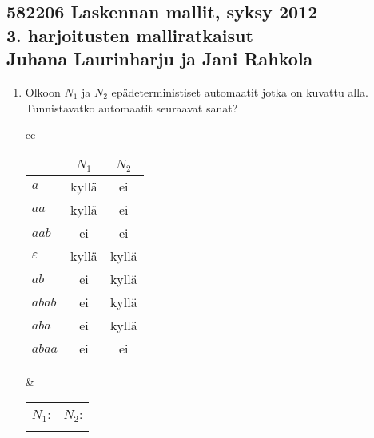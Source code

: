 \documentclass[a4paper,11pt,draft]{article}
\newenvironment{automata}[1][2.8]%
{\begin{tikzpicture}[->,>=stealth',shorten >=1pt,auto,node distance=#1cm,semithick]}%
{\end{tikzpicture}}
\begin{document}
\subsection*{582206 Laskennan mallit, syksy 2012 \\
  \textmd{3. harjoitusten malliratkaisut \\
    Juhana Laurinharju ja Jani Rahkola}}

\begin{enumerate}
\item
  Olkoon $N_1$ ja $N_2$ epädeterministiset automaatit jotka on kuvattu
  alla. Tunnistavatko automaatit seuraavat sanat?

  \begin{center}
    \begin{tabular}{cc}
      \begin{tabular}{l|c|c}
        & $N_1$ & $N_2$ \\
        \hline
        $a$ & kyllä & ei \\
        $aa$ & kyllä & ei \\
        $aab$ & ei & ei \\
        $\varepsilon$ & kyllä & kyllä \\
        $ab$ & ei & kyllä \\
        $abab$ & ei & kyllä \\
        $aba$ & ei & kyllä \\
        $abaa$ & ei & ei
      \end{tabular}
      &
      \begin{tabular}{cc}
        $N_1$: & $N_2$: \\
        \begin{automata}[2]
          \node[state,initial above,accepting] (q0)               {$q_0$};
          \node[state]                         (q1) [below of=q0] {$q_1$};
          
          \path (q0) edge [loop right] node {$a$} ()
          edge              node {$a$} (q1)
          (q1) edge [loop right] node {$b$} ();
        \end{automata}
        &
        \begin{automata}[2]
          \node[state,initial,accepting] (q0)               {$q_0$};
          \node[state]                   (q1) [right of=q0] {$q_1$};
          \node[state,accepting]         (q2) [right of=q1] {$q_2$};
          \node[state,accepting]         (q3) [below of=q1] {$q_3$};
          
          \path (q0) edge             node        {$a$} (q1)
          (q1) edge             node        {$b$} (q2)
          edge             node        {$b$} (q3)
          (q2) edge [bend left] node        {$a$} (q1)
          (q3) edge             node [swap] {$a$} (q2);
        \end{automata}
      \end{tabular}
    \end{tabular}
  \end{center}


\end{enumerate}
\end{document}
